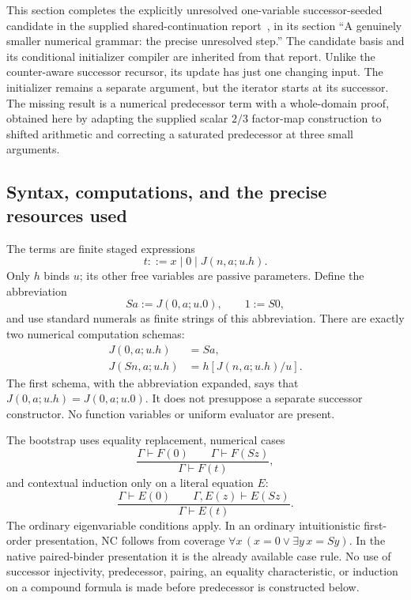 \documentclass[11pt,letterpaper]{article}
\theoremstyle{definition}\newtheorem{definition}[theorem]{Definition}
\theoremstyle{remark}\newtheorem{remark}[theorem]{Remark}
\begin{document}
This section completes the explicitly unresolved one-variable
successor-seeded candidate in the supplied shared-continuation
report~\cite{shared}, in its section ``A genuinely smaller numerical
grammar: the precise unresolved step.''  The candidate basis and its
conditional initializer compiler are inherited from that report.
Unlike the counter-aware successor recursor, its update has just one
changing input.  The initializer remains a separate argument, but the
iterator starts at its successor.  The missing result is a numerical
predecessor term with a whole-domain proof, obtained here by adapting
the supplied scalar $2/3$ factor-map construction to shifted arithmetic
and correcting a saturated predecessor at three small arguments.

\subsection{Syntax, computations, and the precise resources used}

The terms are finite staged expressions
\[
 t ::= x\mid 0\mid J(n,a;u.h).
\]
Only $h$ binds $u$; its other free variables are passive parameters.
Define the abbreviation
\[
 Sa:=J(0,a;u.0),\qquad 1:=S0,
\]
and use standard numerals as finite strings of this abbreviation.
There are exactly two numerical computation schemas:
\begin{align}
 J(0,a;u.h)&=Sa,\tag{J0}\label{js:j0}\\
 J(Sn,a;u.h)&=h[J(n,a;u.h)/u].\tag{JS}\label{js:js}
\end{align}
The first schema, with the abbreviation expanded, says that
$J(0,a;u.h)=J(0,a;u.0)$.  It does not presuppose a separate successor
constructor.  No function variables or uniform evaluator are present.

The bootstrap uses equality replacement, numerical cases
\[
 \frac{\Gamma\vdash F(0)\qquad\Gamma\vdash F(Sz)}
      {\Gamma\vdash F(t)},
 \tag{NC}\label{js:nc}
\]
and contextual induction only on a literal equation $E$:
\[
 \frac{\Gamma\vdash E(0)\qquad\Gamma,E(z)\vdash E(Sz)}
      {\Gamma\vdash E(t)}.
 \tag{EI}\label{js:ei}
\]
The ordinary eigenvariable conditions apply.  In an ordinary
intuitionistic first-order presentation, NC follows from coverage
$\forall x\,(x=0\vee\exists y\,x=Sy)$.  In the native paired-binder
presentation it is the already available case rule.  No use of
successor injectivity, predecessor, pairing, an equality characteristic,
or induction on a compound formula is made before predecessor is
constructed below.
\end{document}
